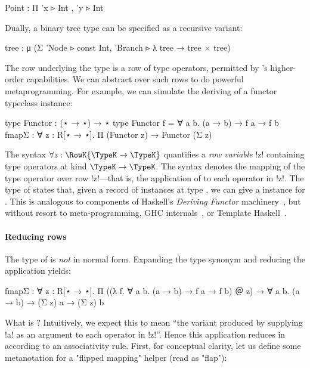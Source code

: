 \begin{rosi} 
Point : Π {'x ▹ Int , 'y ▹ Int}
\end{rosi}

\Ni Dually, a binary tree type can be specified as a recursive variant: 

\begin{rosi}
tree : μ (Σ {'Node   ▹ const Int, 
             'Branch ▹ λ tree → tree × tree})
\end{rosi}

\Ni The row underlying the  type is a row of type operators, permitted by \Rome's higher-order capabilities. We can abstract over such rows to do powerful metaprogramming. For example, we can simulate the deriving of a functor typeclass instance: 

\begin{rosi}
type Functor : (⋆ → ⋆) → ⋆
type Functor f = ∀ a b. (a → b) → f a → f b
fmapΣ : ∀ z : R[⋆ → ⋆]. Π (Functor z) → Functor (Σ z)
\end{rosi}

The syntax $\forall z : \RowK {\TypeK \to \TypeK}$ quantifies a \emph{row variable} !z! containing type operators at kind $\TypeK \to \TypeK$. The syntax   denotes the mapping of the  type operator over row !z!---that is, the application of  to each operator in !z!. The type of  states that, given a record of  instances at type  , we can give a  instance for . This is analogous to components of Haskell's \emph{Deriving Functor} machinery~\citep{Laarhoven07}, but without resort to meta-programming, GHC internals~\citep{GhcAPI}, or Template Haskell~\cite{SheardJ02}.

\paragraph{Reducing rows}
\label{sec:reducing-rows2}

The type of  is \emph{not} in normal form. Expanding the  type synonym and reducing the application   yields:


\begin{rosi}
fmapΣ : ∀ z : R[⋆ → ⋆].
        Π ((λ f. ∀ a b. 
            (a → b) → f a → f b) ＠ z) →
        ∀ a b. (a → b) → (Σ z) a → (Σ z) b 
\end{rosi}


What is ? Intuitively, we expect this to mean ``the variant produced by supplying !a! as an argument to each operator in !z!''. Hence this application reduces in \Rome{} according to an associativity rule. First, for conceptual clarity, let us define some metanotation for a "flipped mapping" helper  (read as "flap"):

